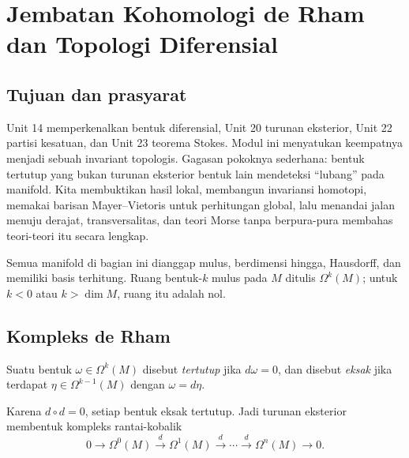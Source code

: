 
\setcounter{section}{31}
\section{Jembatan Kohomologi de Rham dan Topologi Diferensial}
\label{o011-bridge-de-rham}

\subsection{Tujuan dan prasyarat}

Unit 14 memperkenalkan bentuk diferensial, Unit 20 turunan eksterior, Unit 22
partisi kesatuan, dan Unit 23 teorema Stokes. Modul ini menyatukan keempatnya
menjadi sebuah invariant topologis. Gagasan pokoknya sederhana: bentuk tertutup
yang bukan turunan eksterior bentuk lain mendeteksi ``lubang'' pada manifold.
Kita membuktikan hasil lokal, membangun invariansi homotopi, memakai barisan
Mayer--Vietoris untuk perhitungan global, lalu menandai jalan menuju derajat,
transversalitas, dan teori Morse tanpa berpura-pura membahas teori-teori itu
secara lengkap.

Semua manifold di bagian ini dianggap mulus, berdimensi hingga, Hausdorff, dan
memiliki basis terhitung. Ruang bentuk-$k$ mulus pada $M$ ditulis
$\Omega^k(M)$; untuk $k<0$ atau $k>\dim M$, ruang itu adalah nol.

\subsection{Kompleks de Rham}

\begin{definition}\label{o011-br-def-closed-exact}
Suatu bentuk $\omega\in\Omega^k(M)$ disebut \emph{tertutup} jika
$d\omega=0$, dan disebut \emph{eksak} jika terdapat
$\eta\in\Omega^{k-1}(M)$ dengan $\omega=d\eta$.
\end{definition}

Karena $d\circ d=0$, setiap bentuk eksak tertutup. Jadi turunan eksterior
membentuk kompleks rantai-kobalik
\[
  0\longrightarrow\Omega^0(M)\xrightarrow{d}\Omega^1(M)
  \xrightarrow{d}\cdots\xrightarrow{d}\Omega^n(M)
  \longrightarrow0.
\]

